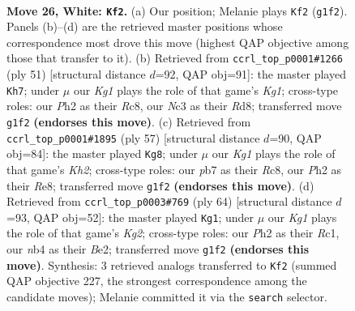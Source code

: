 \documentclass[11pt]{article}
\begin{document}
\clearpage

\begin{figure}[p]\centering
\begin{subfigure}{0.46\textwidth}\centering
\resizebox{\linewidth}{!}{%
\newchessgame
\chessboard[
  setfen={1nb1q1r1/rp3k2/2p1p3/p2p1p1p/Pn1P1P1N/2N3P1/1PPQ3P/3R1BKR w - - 5 26},
  showmover=false,
  pgfstyle=straightmove, color=movearrow, markmove={g1-f2}
]}
\caption{}
\end{subfigure}\hfill
\begin{subfigure}{0.46\textwidth}\centering
\resizebox{\linewidth}{!}{%
\newchessgame
\chessboard[
  setfen={2rrb1k1/1pq2p2/p2pp2p/P3n1pn/1PP1P3/N1N1Q2P/3R1PP1/3R1BK1 b - - 0 26},
  showmover=false,
  pgfstyle=straightmove, color=movearrow, markmove={g8-h7}
]}
\caption{}
\end{subfigure}
\\[4pt]
\begin{subfigure}{0.46\textwidth}\centering
\resizebox{\linewidth}{!}{%
\newchessgame
\chessboard[
  setfen={2r1r3/5pbk/2q1p1p1/pp1p3p/2nP1B1P/P1PN2P1/1PQ1RPK1/4R3 b - - 9 29},
  showmover=false,
  pgfstyle=straightmove, color=movearrow, markmove={h7-g8}
]}
\caption{}
\end{subfigure}\hfill
\begin{subfigure}{0.46\textwidth}\centering
\resizebox{\linewidth}{!}{%
\newchessgame
\chessboard[
  setfen={3r1bk1/1prq1p2/p2pp1p1/PP2n2p/2PN3P/4P1P1/2RQBPK1/2R5 w - - 9 33},
  showmover=false,
  pgfstyle=straightmove, color=movearrow, markmove={g2-g1}
]}
\caption{}
\end{subfigure}
\caption{\textbf{Move 26, White: \texttt{Kf2}.} (a) Our position; Melanie plays \texttt{Kf2} (\texttt{g1f2}). Panels (b)--(d) are the retrieved master positions whose correspondence most drove this move (highest QAP objective among those that transfer to it). (b) Retrieved from \texttt{ccrl\_top\_p0001\#1266} (ply 51) [structural distance $d$=92, QAP obj=91]: the master played \texttt{Kh7}; under $\mu$ our \emph{Kg1} plays the role of that game's \emph{Kg1}; cross-type roles: our \emph{P}h2 as their \emph{R}c8, our \emph{N}c3 as their \emph{R}d8; transferred move \texttt{g1f2} \textbf{(endorses this move)}. (c) Retrieved from \texttt{ccrl\_top\_p0001\#1895} (ply 57) [structural distance $d$=90, QAP obj=84]: the master played \texttt{Kg8}; under $\mu$ our \emph{Kg1} plays the role of that game's \emph{Kh2}; cross-type roles: our \emph{p}b7 as their \emph{R}c8, our \emph{P}h2 as their \emph{R}e8; transferred move \texttt{g1f2} \textbf{(endorses this move)}. (d) Retrieved from \texttt{ccrl\_top\_p0003\#769} (ply 64) [structural distance $d$=93, QAP obj=52]: the master played \texttt{Kg1}; under $\mu$ our \emph{Kg1} plays the role of that game's \emph{Kg2}; cross-type roles: our \emph{P}h2 as their \emph{R}c1, our \emph{n}b4 as their \emph{B}e2; transferred move \texttt{g1f2} \textbf{(endorses this move)}. Synthesis: 3 retrieved analogs transferred to \texttt{Kf2} (summed QAP objective 227, the strongest correspondence among the candidate moves); Melanie committed it via the \texttt{search} selector.}
\label{fig:thought-m50}
\end{figure}
\end{document}
